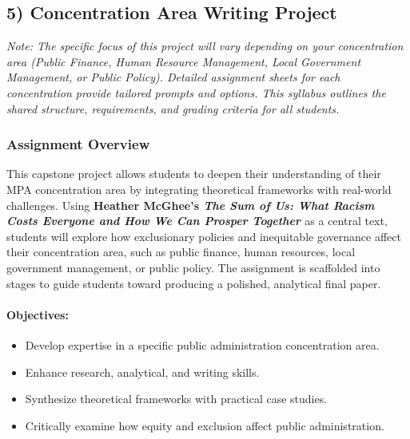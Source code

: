 \documentclass[12pt]{article}     %
\begin{document}
\subsection*{5) Concentration Area Writing Project}

\noindent \textit{Note: The specific focus of this project will vary depending on your concentration area (Public Finance, Human Resource Management, Local Government Management, or Public Policy). Detailed assignment sheets for each concentration provide tailored prompts and options. This syllabus outlines the shared structure, requirements, and grading criteria for all students.}

\subsubsection*{Assignment Overview}

This capstone project allows students to deepen their understanding of their MPA concentration area by integrating theoretical frameworks with real-world challenges. Using \textbf{Heather McGhee's \textit{The Sum of Us: What Racism Costs Everyone and How We Can Prosper Together} \citeyearpar{mcghee2021}} as a central text, students will explore how exclusionary policies and inequitable governance affect their concentration area, such as public finance, human resources, local government management, or public policy. The assignment is scaffolded into stages to guide students toward producing a polished, analytical final paper.

\paragraph*{Objectives:}
\begin{itemize}
    \item Develop expertise in a specific public administration concentration area.
    \item Enhance research, analytical, and writing skills.
    \item Synthesize theoretical frameworks with practical case studies.
    \item Critically examine how equity and exclusion affect public administration.
\end{itemize}
\end{document}

